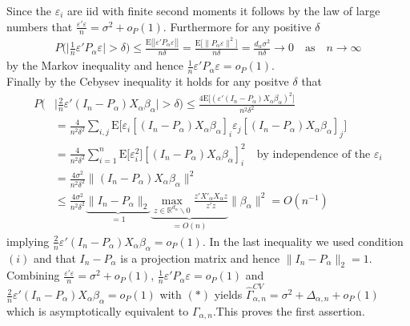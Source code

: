 \documentclass[Research_Module_ES.tex]{subfiles}
\begin{document}
Since the $\varepsilon_i$ are iid with finite second moments it follows by the law of large numbers that
$\frac{\varepsilon'\varepsilon}{n} = \sigma^2 + o_P(1)$.
Furthermore for any positive $\delta$
\begin{align*}
P\biggl(\biggl|\frac{1}{n}\varepsilon'P_\alpha\varepsilon\biggr|>\delta\biggr) \le \frac{\mathrm{E}\bigl[|\varepsilon'P_\alpha\varepsilon|\bigr]}{n\delta}=\frac{\mathrm{E}\bigl[\lVert P_\alpha\varepsilon\rVert^2\bigr]}{n\delta}=\frac{d_\alpha \sigma^2}{n\delta} \to 0 \quad \textrm{as} \quad n\to \infty
\end{align*}
by the Markov inequality and hence $\frac{1}{n}\varepsilon'P_\alpha\varepsilon = o_P(1)$.\\
Finally by the Cebysev inequality it holds for any positve $\delta$ that
\begin{align*}
P\biggl(&\biggl|\frac{2}{n}\varepsilon'(I_n-P_\alpha)X_\alpha\beta_\alpha\biggr|>\delta\biggr) \le \frac{4\mathrm{E}\bigl[(\varepsilon'(I_n-P_\alpha)X_\alpha\beta_\alpha)^2\bigr]}{n^2\delta^2}\\
&=\frac{4}{n^2\delta^2}\sum_{i,j}\mathrm{E}\bigl[\varepsilon_i[(I_n-P_\alpha)X_\alpha\beta_\alpha]_i\varepsilon_j[(I_n-P_\alpha)X_\alpha\beta_\alpha]_j\bigr]\\
&=\frac{4}{n^2\delta^2}\sum_{i=1}^n\mathrm{E}\bigl[\varepsilon_i^2\bigr][(I_n-P_\alpha)X_\alpha\beta_\alpha]_i^2 \quad \textrm{by independence of the $\varepsilon_i$}\\
&=\frac{4\sigma^2}{n^2\delta^2}\lVert(I_n-P_\alpha)X_\alpha\beta_\alpha\rVert^2 \\
&\le \frac{4\sigma^2}{n^2\delta^2} \underbrace{\lVert I_n-P_\alpha \rVert_2}_{=1} \underbrace{\max_{z\in \mathbb{R}^{d_\alpha}\backslash 0}\frac{z'X'_\alpha X_\alpha z}{z'z}}_{=O(n)} \lVert \beta_\alpha \rVert^2
=O(n^{-1})
\end{align*}
implying $\frac{2}{n}\varepsilon'(I_n-P_\alpha)X_\alpha\beta_\alpha=o_P(1)$. 
In the last inequality we used condition $(i)$ and that $I_n-P_\alpha$ is a projection matrix and hence $\lVert I_n-P_\alpha \rVert_2 = 1$.\\
Combining $\frac{\varepsilon'\varepsilon}{n} = \sigma^2 + o_P(1)$, $\frac{1}{n}\varepsilon'P_\alpha\varepsilon = o_P(1)$ and $\frac{2}{n}\varepsilon'(I_n-P_\alpha)X_\alpha\beta_\alpha=o_P(1)$ with $(\ast)$ yields $\hat{\Gamma}_{\alpha,n}^{CV} = \sigma^2 + \Delta_{\alpha,n} + o_P(1)$ which is asymptotically equivalent to $\Gamma_{\alpha,n}$.This proves the first assertion.\\
\end{document}
